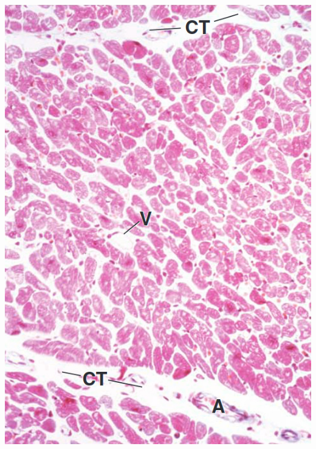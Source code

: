 \begin{itemize}
\begin{center}
    \includegraphics[scale=0.18]{images/week-1-rp9.jpg}

\end{center}
\end{itemize}
